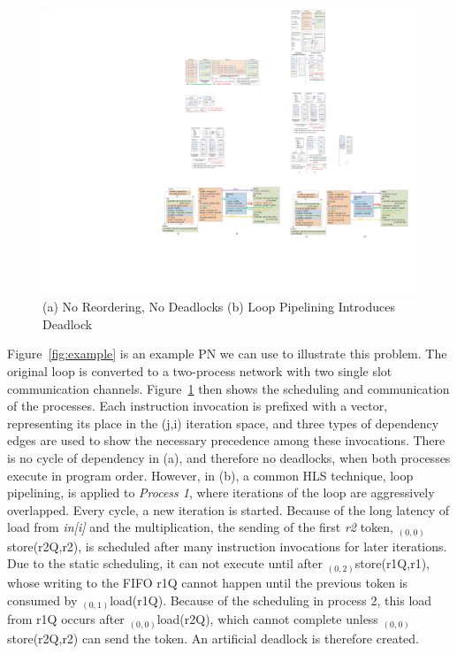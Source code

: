 \documentclass{sig-alternate}
\begin{document}
\begin{figure}[htp]
\begin{center}
\includegraphics[width=1.0\linewidth]{fig/twoSchedules.pdf}
\caption{(a) No Reordering, No Deadlocks (b) Loop Pipelining Introduces Deadlock
\label{fig:2schedules}}
\end{center}
\vspace{-2.0em}
\end{figure}

Figure~\ref{fig:example} is an example PN we can use to illustrate this problem. The original loop is converted to a two-process network
with two single slot communication channels.
Figure~\ref{fig:2schedules} then shows the scheduling and communication of the processes. Each instruction invocation is prefixed with a vector, representing its place in the (j,i) iteration space, and three types of dependency edges are used
to show the necessary precedence among these invocations. There is no cycle of
dependency in (a), and therefore no deadlocks, when both processes execute in program order. However, in (b), 
a common HLS technique, loop pipelining, is applied to \textit{Process 1}, where
iterations of the loop are aggressively overlapped. Every cycle, a new iteration is started. Because of the long latency of load from \textit{in[i]} and
the multiplication, the sending of the first \textit{r2} token, $_{(0,0)}$store(r2Q,r2), is scheduled
after many instruction invocations for later iterations. Due to the static scheduling, it can not execute until after $_{(0,2)}$store(r1Q,r1), whose
writing to the FIFO r1Q cannot happen until the previous token is consumed by 
$_{(0,1)}$load(r1Q). Because of the scheduling in process 2, this load from r1Q
occurs after $_{(0,0)}$load(r2Q), which cannot complete unless $_{(0,0)}$store(r2Q,r2)
can send the token.  An artificial deadlock is therefore created. 
\end{document}
